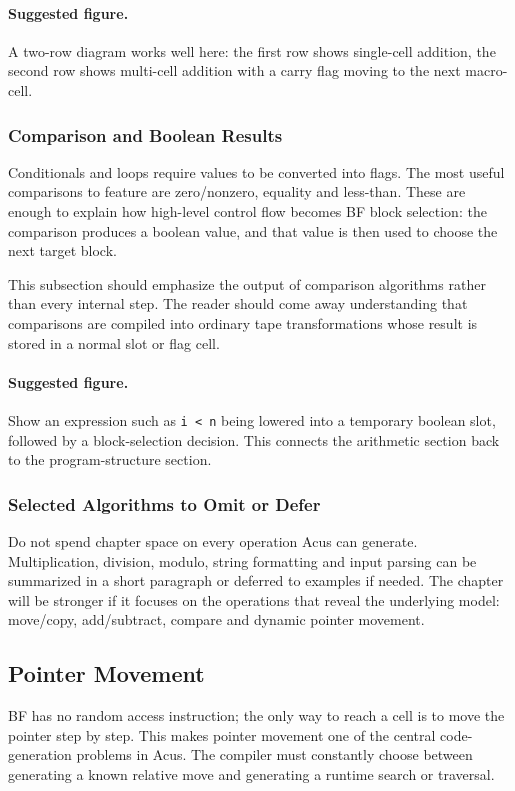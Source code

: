 \paragraph{Suggested figure.}
A two-row diagram works well here: the first row shows single-cell addition, the second row shows multi-cell addition with a carry flag moving to the next macro-cell.

\subsubsection{Comparison and Boolean Results}
Conditionals and loops require values to be converted into flags. The most useful comparisons to feature are zero/nonzero, equality and less-than. These are enough to explain how high-level control flow becomes BF block selection: the comparison produces a boolean value, and that value is then used to choose the next target block.

This subsection should emphasize the output of comparison algorithms rather than every internal step. The reader should come away understanding that comparisons are compiled into ordinary tape transformations whose result is stored in a normal slot or flag cell.

\paragraph{Suggested figure.}
Show an expression such as \texttt{i < n} being lowered into a temporary boolean slot, followed by a block-selection decision. This connects the arithmetic section back to the program-structure section.

\subsubsection{Selected Algorithms to Omit or Defer}
Do not spend chapter space on every operation Acus can generate. Multiplication, division, modulo, string formatting and input parsing can be summarized in a short paragraph or deferred to examples if needed. The chapter will be stronger if it focuses on the operations that reveal the underlying model: move/copy, add/subtract, compare and dynamic pointer movement.

\subsection{Pointer Movement}
BF has no random access instruction; the only way to reach a cell is to move the pointer step by step. This makes pointer movement one of the central code-generation problems in Acus. The compiler must constantly choose between generating a known relative move and generating a runtime search or traversal.

